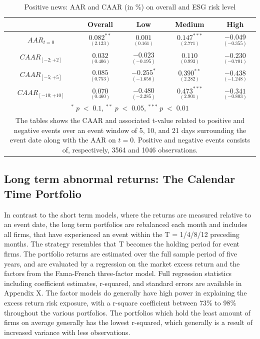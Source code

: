 \begin{table}[H]
\centering
\caption{Positive news: AAR and CAAR (in \%) on overall and ESG risk level} 
\begin{tabular}{ccccc}
  \hline  \hline
  & \multicolumn{1}{c}{Overall} &  \multicolumn{1}{c}{Low} & \multicolumn{1}{c}{Medium} & \multicolumn{1}{c}{High}\\  
 \hline
$AAR_{t=0}$ &  $\underset{(2.123)}{0.082^{**}}$ & $\underset{(0.161)}{0.001}$ & $\underset{(2.771)}{0.147^{***}}$ &  $\underset{(-0.355)}{-0.049}$ \\ 
$CAAR_{[-2;+2]}$  & $\underset{(0.406)}{0.032}$ &  $\underset{(-0.195)}{-0.023}$ &  $\underset{(0.993)}{0.110}$ &  $\underset{(-0.701)}{-0.230}$ \\ 
$CAAR_{[-5;+5]}$  & $\underset{(0.753)}{0.085}$ &  $\underset{(-1.658)}{-0.255^{*}}$ &  $\underset{(2.282)}{0.390^{**}}$ &  $\underset{(-1.248)}{-0.438}$ \\ 
$CAAR_{[-10;+10]}$    & $\underset{(0.460)}{0.070}$ &  $\underset{(-2.285)}{-0.480}$ &  $\underset{(2.901)}{0.473^{***}}$ &  $\underset{(-0.803)}{-0.341}$ \\ 
    \hline \hline
   \multicolumn{5}{p{10cm}}{ \footnotesize $^* \; p\; <\; 0.1$, $ ^{**} \; p\; <\; 0.05$, $ ^{***} \; p\; <\; 0.01$  } \\
   \multicolumn{5}{p{10cm}}{\footnotesize The tables shows the CAAR and associated t-value related to positive and negative events over an event window of 5, 10, and 21 days surrounding the event date along with the AAR on $t=0$. Positive and negative events consists of, respectively, 3564 and 1046 observations. } \\
   \hline
\end{tabular}
\label{tab: ST_pos_significance}
\end{table}




\subsection{Long term abnormal returns: The Calendar Time Portfolio} \label{sec: long_term_portfolio}

In contrast to the short term models, where the returns are measured relative to an event date, the long term portfolios are rebalanced each month and includes all firms, that have experienced an event within the T = 1/4/8/12 preceding months. The strategy resembles that T becomes the holding period for event firms. The portfolio returns are estimated over the full sample period of five years, and are evaluated by a regression on the market excess return and the factors from the Fama-French \citeyear{Fama_french_3fac} three-factor model. Full regression statistics including coefficient estimates, r-squared, and standard errors are available in Appendix X. The factor models do generally have high power in explaining the excess return risk exposure, with a r-square coefficient between 73\% to 98\% throughout the various portfolios. The portfolios which hold the least amount of firms on average generally has the lowest r-squared, which generally is a result of increased variance with less observations.  


